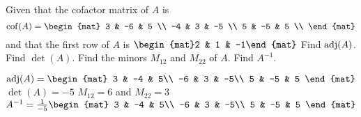 
\begin{Exercise}[
name={},
title={}, 
difficulty=0,
origin={\cite{MB}}]
Given that the cofactor matrix of $A$ is
\[
\cof(A)=
\begin{mat}
  3 & -6 & 5 \\
  -4 & 3 & -5 \\
  5 & -5 & 5 \\
\end{mat}
\] and that the first row of $A$ is $\begin{mat}2 & 1 & -1\end{mat}$
\Question Find $\operatorname{adj}(A)$.
\Question Find $\det(A)$.
\Question Find the minors $M_{12}$ and $M_{22}$ of $A$.
\Question Find $A^{-1}$.
\end{Exercise}

\begin{Answer}
\begin{multicols}{2}
\Question $\adj(A) =
\begin{mat}
3 & -4 & 5\\
-6 & 3 & -5\\
5 & -5 & 5
\end{mat}$
\Question $\det(A) = -5$
\Question $M_{12}=6$ and $M_{22}=3$
\Question $A^{-1}=\frac{1}{-5}
\begin{mat}
3 & -4 & 5\\
-6 & 3 & -5\\
5 & -5 & 5
\end{mat}$
\EndCurrentQuestion
\end{multicols}
\end{Answer}
